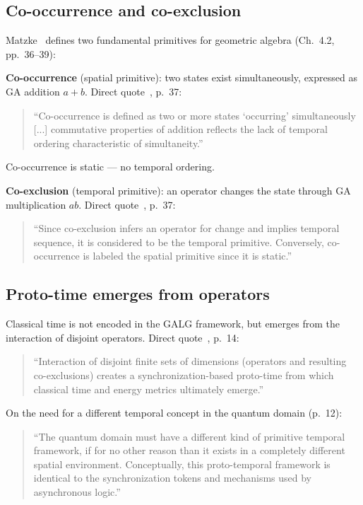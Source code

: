 \subsection{Co-occurrence and co-exclusion}

Matzke~\cite{Matzke2002} defines two fundamental primitives
for geometric algebra (Ch.~4.2, pp.~36--39):

\textbf{Co-occurrence} (spatial primitive): two states exist
simultaneously, expressed as GA addition $a+b$.
Direct quote~\cite{Matzke2002}, p.~37:
\begin{quote}
``Co-occurrence is defined as two or more states `occurring'
simultaneously [...] commutative properties of addition reflects
the lack of temporal ordering characteristic of simultaneity.''
\end{quote}
Co-occurrence is static --- no temporal ordering.

\textbf{Co-exclusion} (temporal primitive): an operator changes
the state through GA multiplication $ab$.
Direct quote~\cite{Matzke2002}, p.~37:
\begin{quote}
``Since co-exclusion infers an operator for change and implies
temporal sequence, it is considered to be the temporal primitive.
Conversely, co-occurrence is labeled the spatial primitive
since it is static.''
\end{quote}

\subsection{Proto-time emerges from operators}

Classical time is not encoded in the GALG framework,
but emerges from the interaction of disjoint operators.
Direct quote~\cite{Matzke2002}, p.~14:
\begin{quote}
``Interaction of disjoint finite sets of dimensions
(operators and resulting co-exclusions) creates a
synchronization-based proto-time from which classical time
and energy metrics ultimately emerge.''
\end{quote}

On the need for a different temporal concept in the quantum domain
(p.~12):
\begin{quote}
``The quantum domain must have a different kind of primitive
temporal framework, if for no other reason than it exists in
a completely different spatial environment. Conceptually, this
proto-temporal framework is identical to the synchronization
tokens and mechanisms used by asynchronous logic.''
\end{quote}

